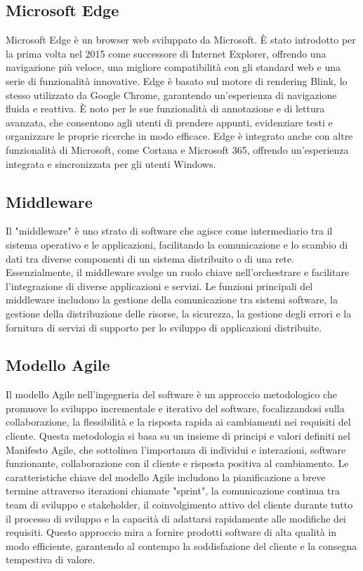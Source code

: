 \documentclass{article}
\begin{document}
\subsection{Microsoft Edge}
Microsoft Edge è un browser web sviluppato da Microsoft. È stato introdotto per la prima volta nel 2015 come successore di Internet Explorer, offrendo una navigazione più veloce, una migliore compatibilità con gli standard web e una serie di funzionalità innovative. Edge è basato sul motore di rendering Blink, lo stesso utilizzato da Google Chrome, garantendo un'esperienza di navigazione fluida e reattiva. È noto per le sue funzionalità di annotazione e di lettura avanzata, che consentono agli utenti di prendere appunti, evidenziare testi e organizzare le proprie ricerche in modo efficace. Edge è integrato anche con altre funzionalità di Microsoft, come Cortana e Microsoft 365, offrendo un'esperienza integrata e sincronizzata per gli utenti Windows.

\subsection{Middleware}
Il "middleware" è uno strato di software che agisce come intermediario tra il sistema operativo e le applicazioni, facilitando la comunicazione e lo scambio di dati tra diverse componenti di un sistema distribuito o di una rete. Essenzialmente, il middleware svolge un ruolo chiave nell'orchestrare e facilitare l'integrazione di diverse applicazioni e servizi. Le funzioni principali del middleware includono la gestione della comunicazione tra sistemi software, la gestione della distribuzione delle risorse, la sicurezza, la gestione degli errori e la fornitura di servizi di supporto per lo sviluppo di applicazioni distribuite.

\subsection{Modello Agile}
Il modello Agile nell'ingegneria del software è un approccio metodologico che promuove lo sviluppo incrementale e iterativo del software, focalizzandosi sulla collaborazione, la flessibilità e la risposta rapida ai cambiamenti nei requisiti del cliente. Questa metodologia si basa su un insieme di principi e valori definiti nel Manifesto Agile, che sottolinea l'importanza di individui e interazioni, software funzionante, collaborazione con il cliente e risposta positiva al cambiamento. Le caratteristiche chiave del modello Agile includono la pianificazione a breve termine attraverso iterazioni chiamate "sprint", la comunicazione continua tra team di sviluppo e stakeholder, il coinvolgimento attivo del cliente durante tutto il processo di sviluppo e la capacità di adattarsi rapidamente alle modifiche dei requisiti. Questo approccio mira a fornire prodotti software di alta qualità in modo efficiente, garantendo al contempo la soddisfazione del cliente e la consegna tempestiva di valore.
\end{document}
